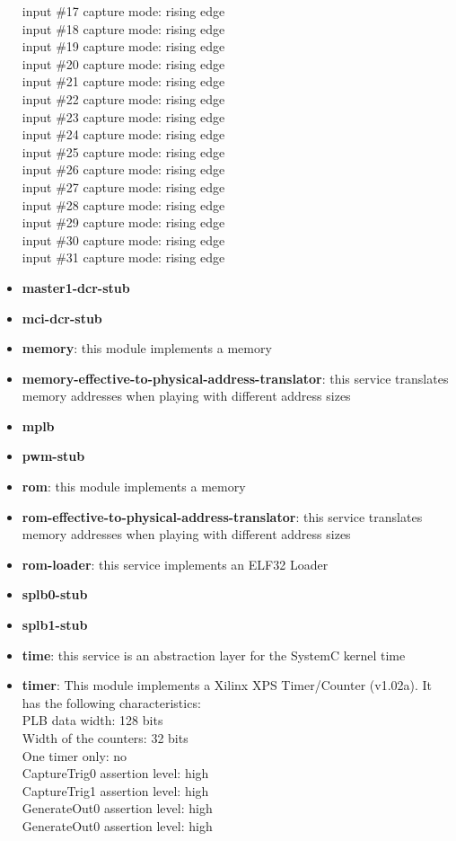 \begin{itemize}
input \#17 capture mode: rising edge\\
input \#18 capture mode: rising edge\\
input \#19 capture mode: rising edge\\
input \#20 capture mode: rising edge\\
input \#21 capture mode: rising edge\\
input \#22 capture mode: rising edge\\
input \#23 capture mode: rising edge\\
input \#24 capture mode: rising edge\\
input \#25 capture mode: rising edge\\
input \#26 capture mode: rising edge\\
input \#27 capture mode: rising edge\\
input \#28 capture mode: rising edge\\
input \#29 capture mode: rising edge\\
input \#30 capture mode: rising edge\\
input \#31 capture mode: rising edge\\

\item \textbf{master1-dcr-stub}
\item \textbf{mci-dcr-stub}
\item \textbf{memory}: this module implements a memory
\item \textbf{memory-effective-to-physical-address-translator}: this service translates memory addresses when playing with different address sizes
\item \textbf{mplb}
\item \textbf{pwm-stub}
\item \textbf{rom}: this module implements a memory
\item \textbf{rom-effective-to-physical-address-translator}: this service translates memory addresses when playing with different address sizes
\item \textbf{rom-loader}: this service implements an ELF32 Loader
\item \textbf{splb0-stub}
\item \textbf{splb1-stub}
\item \textbf{time}: this service is an abstraction layer for the SystemC kernel time
\item \textbf{timer}: This module implements a Xilinx XPS Timer/Counter (v1.02a). It has the following characteristics:\\
PLB data width: 128 bits\\
Width of the counters: 32 bits\\
One timer only: no\\
CaptureTrig0 assertion level: high\\
CaptureTrig1 assertion level: high\\
GenerateOut0 assertion level: high\\
GenerateOut0 assertion level: high\\

\end{itemize}
